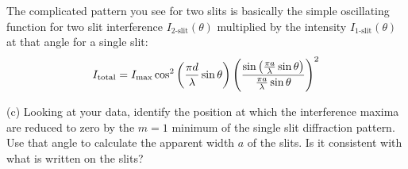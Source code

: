 The complicated pattern you see for two slits is basically the simple oscillating function for two slit interference 
$I_{\operatorname{2-slit}}(\theta)$ multiplied by the intensity $I_{\operatorname{1-slit}}(\theta)$ at that angle for a single slit: 
\begin{displaymath} 
I_{\rm{total}} = I_{\rm{max}} \cos^2 \left (\frac {\pi d} {\lambda} \sin \theta \right) \left(\frac {\sin \left (\frac {\pi a} {\lambda} \sin \theta \right )} {\frac {\pi a} {\lambda} \sin \theta} \right)^2 \end{displaymath}

(c) Looking at your data, identify the position at which the interference maxima  are reduced to zero by the $m=1$ minimum of the single slit diffraction pattern.  Use that angle to calculate the apparent width $a$ of the slits.  Is it consistent with what is written on the slits?
\answerspace{0.5in}
